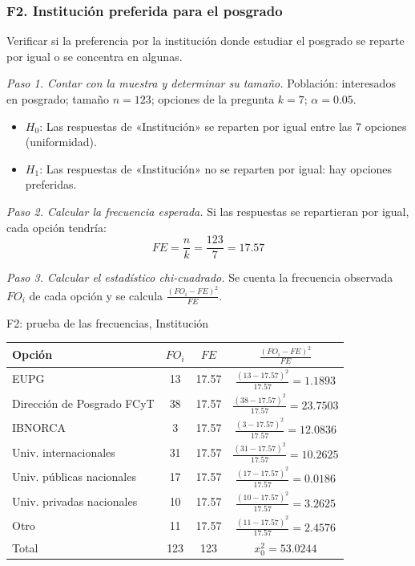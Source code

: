 \subsubsection*{F2. Institución preferida para el posgrado}

Verificar si la preferencia por la institución donde estudiar el posgrado se reparte por igual o se concentra en algunas.

\textit{Paso 1. Contar con la muestra y determinar su tamaño.} Población: interesados en posgrado; tamaño $n = 123$; opciones de la pregunta $k = 7$; $\alpha = 0.05$.

\begin{itemize}[nosep]
  \item $H_0$: Las respuestas de «Institución» se reparten por igual entre las 7 opciones (uniformidad).
  \item $H_1$: Las respuestas de «Institución» no se reparten por igual: hay opciones preferidas.
\end{itemize}

\textit{Paso 2. Calcular la frecuencia esperada.} Si las respuestas se repartieran por igual, cada opción tendría:
\[
FE = \frac{n}{k} = \frac{123}{7} = 17.57
\]

\textit{Paso 3. Calcular el estadístico chi-cuadrado.} Se cuenta la frecuencia observada $FO_i$ de cada opción y se calcula $\frac{(FO_i - FE)^2}{FE}$.

\begin{mitabla}{F2: prueba de las frecuencias, Institución}
\begin{tabular}{L{6cm}ccc}
\toprule
Opción & $FO_i$ & $FE$ & $\frac{(FO_i-FE)^2}{FE}$ \\
\midrule
EUPG & 13 & 17.57 & $\frac{(13-17.57)^2}{17.57} = 1.1893$ \\[3pt]
Dirección de Posgrado FCyT & 38 & 17.57 & $\frac{(38-17.57)^2}{17.57} = 23.7503$ \\[3pt]
IBNORCA & 3 & 17.57 & $\frac{(3-17.57)^2}{17.57} = 12.0836$ \\[3pt]
Univ. internacionales & 31 & 17.57 & $\frac{(31-17.57)^2}{17.57} = 10.2625$ \\[3pt]
Univ. públicas nacionales & 17 & 17.57 & $\frac{(17-17.57)^2}{17.57} = 0.0186$ \\[3pt]
Univ. privadas nacionales & 10 & 17.57 & $\frac{(10-17.57)^2}{17.57} = 3.2625$ \\[3pt]
Otro & 11 & 17.57 & $\frac{(11-17.57)^2}{17.57} = 2.4576$ \\[3pt]
\midrule
Total & 123 & 123 & $x_0^2 = 53.0244$ \\
\bottomrule
\end{tabular}
\end{mitabla}

